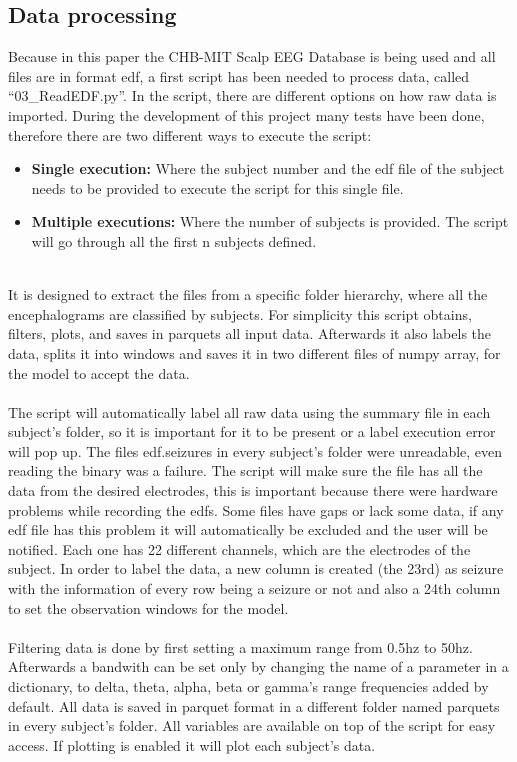 \subsection{Data processing}
Because in this paper the CHB-MIT Scalp EEG Database is being used and all files are in format edf, a first script has been needed to process data, called “03\_ReadEDF.py”. In the script, there are different options on how raw data is imported. During the development of this project many tests have been done, therefore there are two different ways to execute the script:
\\
\begin{itemize}
  \item \textbf{Single execution:} Where the subject number and the edf file of the subject needs to be provided to execute the script for this single file. 
  \item \textbf{Multiple executions:} Where the number of subjects is provided. The script will go through all the first n subjects defined.
\end{itemize}
\leavevmode\\
It is designed to extract the files from a specific folder hierarchy, where all the encephalograms are classified by subjects. For simplicity this script obtains, filters, plots, and saves in parquets all input data. Afterwards it also labels the data, splits it into windows and saves it in two different files of numpy array, for the model to accept the data. 
\\\\
The script will automatically label all raw data using the summary file in each subject’s folder, so it is important for it to be present or a label execution error will pop up. The files edf.seizures in every subject’s folder were unreadable, even reading the binary was a failure. The script will make sure the file has all the data from the desired electrodes, this is important because there were hardware problems while recording the edfs. Some files have gaps or lack some data, if any edf file has this problem it will automatically be excluded and the user will be notified. Each one has 22 different channels, which are the electrodes of the subject. In order to label the data, a new column is created (the 23rd) as seizure with the information of every row being a seizure or not and also a 24th column to set the observation windows for the model.
\\\\
Filtering data is done by first setting a maximum range from 0.5hz to 50hz. Afterwards a bandwith can be set only by changing the name of a parameter in a dictionary, to delta, theta, alpha, beta or gamma’s range frequencies added by default. All data is saved in parquet format in a different folder named parquets in every subject’s folder. All variables are available on top of the script for easy access. If plotting is enabled it will plot each subject’s data. 
